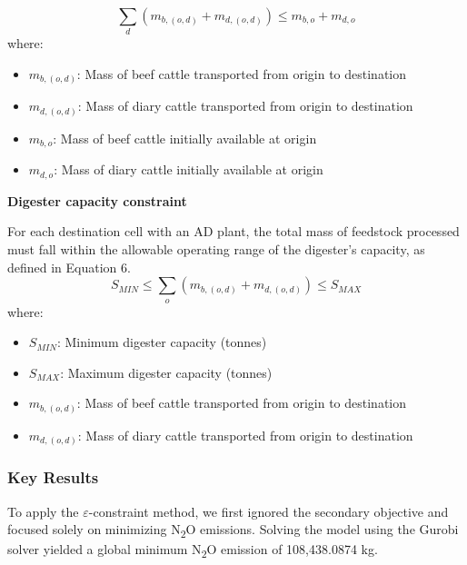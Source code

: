 \documentclass[12pt]{article}
\begin{document}
\begin{equation}
  \sum_d (m_{b, (o, d)} + m_{d, (o, d)}) \leq m_{b,o} + m_{d,o}
\end{equation}
where:
\begin{itemize}
  \item $m_{b, (o, d)}$: Mass of beef cattle transported from origin to destination
  \item $m_{d, (o, d)}$: Mass of diary cattle transported from origin to destination
  \item $m_{b,o}$: Mass of beef cattle initially available at origin
  \item $m_{d,o}$: Mass of diary cattle initially available at origin
\end{itemize}

\vspace{10pt}
\textbf{Digester capacity constraint}

For each destination cell with an AD plant, the total mass of feedstock processed must fall within the allowable operating range of the digester’s capacity, as defined in Equation 6.
\begin{equation}
  S_{MIN} \leq \sum_o (m_{b, (o, d)} + m_{d, (o, d)}) \leq S_{MAX}
\end{equation}
where:
\begin{itemize}
  \item $S_{MIN}$: Minimum digester capacity (tonnes)
  \item $S_{MAX}$: Maximum digester capacity (tonnes)
  \item $m_{b, (o, d)}$: Mass of beef cattle transported from origin to destination
  \item $m_{d, (o, d)}$: Mass of diary cattle transported from origin to destination
\end{itemize}

\subsubsection{Key Results}

To apply the $\varepsilon$-constraint method, we first ignored the secondary objective and focused solely on minimizing N\textsubscript{2}O emissions. Solving the model using the Gurobi solver yielded a global minimum N\textsubscript{2}O emission of 108,438.0874 kg.
\end{document}
